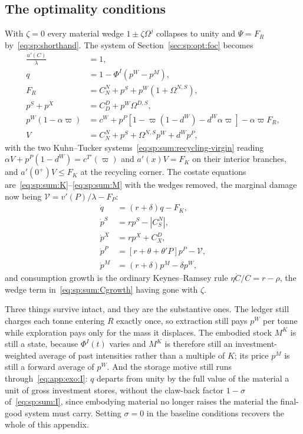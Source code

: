 \subsection{The optimality conditions}\label{sec:app:exo:foc}

With $\zeta=0$ every material wedge $1\pm\zeta\Omega^j$ collapses to unity and
$\Psi=F_R$ by~\eqref{eq:sp:shorthand}. The system of Section~\ref{sec:sp:opt:foc} becomes
\begin{align}
\frac{u'\!\left(C\right)}{\lambda} &= 1,
\label{eq:app:exo:C}
\\
q &= 1-\Phi^I\left(p^W-p^M\right),
\label{eq:app:exo:I}
\\
F_R &= C^N_N+p^S+p^W\left(1+\Omega^{N,S}\right),
\label{eq:app:exo:N}
\\
p^S+p^X &= C^D_D+p^W\Omega^{D,S},
\label{eq:app:exo:D}
\\
p^W\left(1-\alpha\varpi\right) &= c^W+p^P\left[1-\varpi\left(1-d^W\right)-d^W\alpha\varpi\right]-\alpha\varpi F_R,
\label{eq:app:exo:W}
\\
V &= C^N_N+p^S+\Omega^{N,S}p^W+d^Wp^P,
\label{eq:app:exo:V}
\end{align}
with the two Kuhn--Tucker systems~\eqref{eq:sp:sum:recycling-virgin} reading
$\alpha V+p^P\left(1-d^W\right)=c^{T\prime}\!\left(\varpi\right)$ and $a'\!\left(x\right)V=F_K$ on their
interior branches, and $a'\!\left(0^+\right)V\le F_K$ at the recycling corner. The costate equations
are~\eqref{eq:sp:sum:K}--\eqref{eq:sp:sum:M} with the wedges removed, the marginal damage now being
$\mathcal V=v'\!\left(P\right)/\lambda-F_P$:
\begin{align}
\dot q &= \left(r+\delta\right)q-F_K,
\label{eq:app:exo:costate-K}
\\
\dot p^S &= rp^S-\left|C^N_S\right|,
\label{eq:app:exo:costate-S}
\\
\dot p^X &= rp^X+C^D_X,
\label{eq:app:exo:costate-X}
\\
\dot p^P &= \left[r+\theta+\theta'P\right]p^P-\mathcal V,
\label{eq:app:exo:costate-P}
\\
\dot p^M &= \left(r+\delta\right)p^M-\delta p^W,
\label{eq:app:exo:costate-M}
\end{align}
and consumption growth is the ordinary Keynes--Ramsey rule $\eta\dot C/C=r-\rho$, the wedge term
in~\eqref{eq:sp:sum:Cgrowth} having gone with $\zeta$.

Three things survive intact, and they are the substantive ones. The ledger still charges each tonne
entering $R$ exactly once, so extraction still pays $p^W$ per tonne while exploration pays only for the
mass it displaces. The embodied stock $M^K$ is still a state, because $\Phi^I\left(t\right)$ varies and
$M^K$ is therefore still an investment-weighted average of past intensities rather than a multiple of
$K$; its price $p^M$ is still a forward average of $p^W$. And the storage motive still runs
through~\eqref{eq:app:exo:I}: $q$ departs from unity by the full value of the material a unit of gross
investment stores, without the claw-back factor $1-\sigma$ of~\eqref{eq:sp:sum:I}, since embodying
material no longer raises the material the final-good system must carry. Setting $\sigma=0$ in the
baseline conditions recovers the whole of this appendix.

